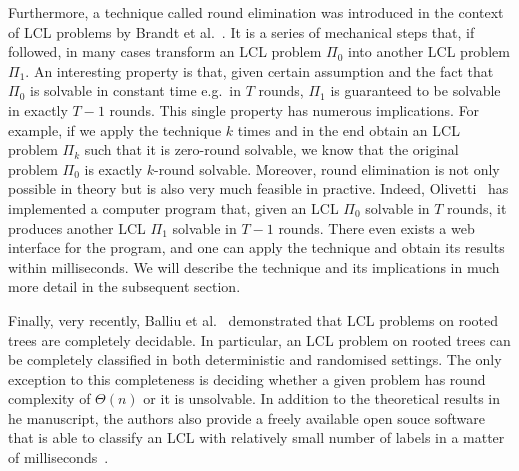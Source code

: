 Furthermore, a technique called round elimination was introduced in the context
of LCL problems by Brandt et al.~\cite{Brandt2019}. It is a series of mechanical
steps that, if followed, in many cases transform an LCL problem $\Pi_0$ into another LCL problem $\Pi_1$. An interesting property is that, given certain assumption and the fact that
$\Pi_0$ is solvable in constant time e.g.\ in $T$ rounds, $\Pi_1$ is guaranteed to be
solvable in exactly $T - 1$ rounds. This single property has numerous implications.
For example, if we apply the technique $k$ times and in the end obtain an LCL problem $\Pi_k$
such that it is zero-round solvable, we know that the original problem $\Pi_0$ is
exactly $k$-round solvable. Moreover, round elimination is not only possible
in theory but is also very much feasible in practive.
Indeed, Olivetti~\cite{Olivetti2020} has
implemented a computer program that, given an LCL $\Pi_0$ solvable in $T$ rounds,
it produces another LCL $\Pi_1$ solvable in $T - 1$ rounds. There even exists
a web interface for the program, and one can apply the technique and obtain
its results within milliseconds. We will describe the technique and its implications
in much more detail in the subsequent section.

Finally, very recently, Balliu et al.~\cite{Balliu2021} demonstrated
that LCL problems on rooted trees are completely decidable.
In particular, an LCL problem on rooted trees can be completely
classified in both deterministic and randomised settings. The only
exception to this completeness is deciding whether a given problem
has round complexity of $\Theta(n)$ or it is unsolvable. In addition
to the theoretical results in he manuscript, the authors also
provide a freely available open souce software that is able to
classify an LCL with relatively small number of labels in a matter
of milliseconds~\cite{Studeny2021}.
